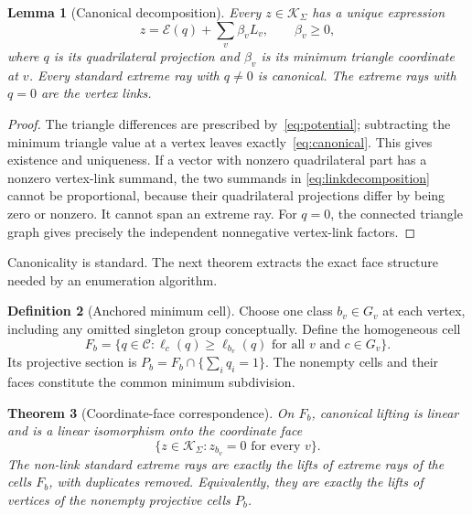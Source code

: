 \documentclass[11pt]{article}
\newtheorem{theorem}{Theorem}[section]
\newtheorem{lemma}[theorem]{Lemma}
\theoremstyle{definition}
\newtheorem{definition}[theorem]{Definition}
\theoremstyle{remark}
\newcommand{\cone}{\mathcal C}\newcommand{\stdcone}{\mathcal K}
\newcommand{\lift}{\mathcal E}\newcommand{\poly}{\operatorname{poly}}
\begin{document}
\begin{lemma}[Canonical decomposition]
\label{lem:canonical}
Every $z\in\stdcone_\Sigma$ has a unique expression
\begin{equation}
 z=\lift(q)+\sum_v\beta_v L_v,\qquad \beta_v\ge0,
 \label{eq:linkdecomposition}
\end{equation}
where $q$ is its quadrilateral projection and $\beta_v$ is its minimum
triangle coordinate at $v$. Every standard extreme ray with $q\ne0$ is
canonical. The extreme rays with $q=0$ are the vertex links.
\end{lemma}

\begin{proof}
The triangle differences are prescribed by~\eqref{eq:potential}; subtracting
the minimum triangle value at a vertex leaves exactly~\eqref{eq:canonical}.
This gives existence and uniqueness. If a vector with nonzero quadrilateral
part has a nonzero vertex-link summand, the two summands in
\eqref{eq:linkdecomposition} cannot be proportional, because their
quadrilateral projections differ by being zero or nonzero. It cannot span an
extreme ray. For $q=0$, the connected triangle graph gives precisely the
independent nonnegative vertex-link factors.
\end{proof}

Canonicality is standard.\cite{burtonconversion} The next theorem extracts
the exact face structure needed by an enumeration algorithm.

\begin{definition}[Anchored minimum cell]
Choose one class $b_v\in G_v$ at each vertex, including any omitted singleton
group conceptually. Define the homogeneous cell
\begin{equation}
 F_b=\{q\in\cone:\ell_c(q)\ge\ell_{b_v}(q)
                 \text{ for all }v\text{ and }c\in G_v\}.
 \label{eq:anchorcell}
\end{equation}
Its projective section is $P_b=F_b\cap\{\sum_iq_i=1\}$.
The nonempty cells and their faces constitute the common minimum subdivision.
\end{definition}

\begin{theorem}[Coordinate-face correspondence]
\label{thm:fan}
On $F_b$, canonical lifting is linear and is a linear isomorphism onto the
coordinate face
\begin{equation}
 \{z\in\stdcone_\Sigma:z_{b_v}=0\text{ for every }v\}.
 \label{eq:anchorface}
\end{equation}
The non-link standard extreme rays are exactly the lifts of extreme rays of
the cells $F_b$, with duplicates removed. Equivalently, they are exactly the
lifts of vertices of the nonempty projective cells $P_b$.
\end{theorem}
\end{document}

